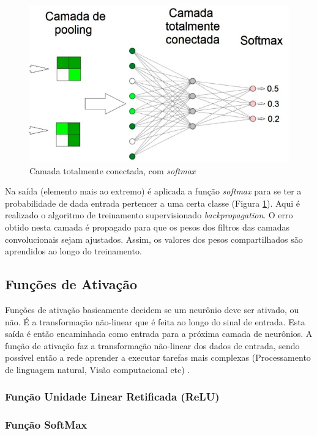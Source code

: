 \begin{figure}
    \centering
    \includegraphics[scale=0.3]{Relatorio/figuras/full_conected.png}
    \caption{Camada totalmente conectada, com \textit{softmax} \cite{eliveltoebermamrenatoa.krohling2018}}
    \label{fig:full}
\end{figure}

Na saída (elemento mais ao extremo) é aplicada a função \textit{softmax} para se ter a probabilidade de dada entrada pertencer a uma certa classe (Figura \ref{fig:full}). Aqui é realizado o algoritmo de treinamento supervisionado \textit{backpropagation}. O erro obtido nesta camada é propagado para que os pesos dos filtros das camadas convolucionais sejam ajustados. Assim, os valores dos pesos compartilhados são aprendidos ao longo do treinamento.


\subsection{Funções de Ativação}

Funções de ativação basicamente decidem se um neurônio deve ser ativado, ou não. É a transformação não-linear que é feita ao longo do sinal de entrada. Esta saída é então encaminhada como entrada para a próxima camada de neurônios. A função de ativação faz a transformação não-linear dos dados de entrada, sendo possível então a rede aprender a executar tarefas mais complexas (Processamento de linguagem natural, Visão computacional etc) \cite{haykin2007redes}. 

\subsubsection{Função Unidade Linear Retificada (ReLU)}
\subsubsection{Função SoftMax}

